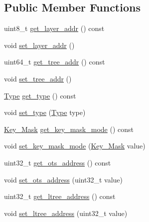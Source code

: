 \subsection*{Public Member Functions}
\begin{DoxyCompactItemize}
\item 
uint8\+\_\+t \hyperlink{class_botan_1_1_x_m_s_s___address_ac71959711edb3f719e371942247f2c74}{get\+\_\+layer\+\_\+addr} () const
\item 
void \hyperlink{class_botan_1_1_x_m_s_s___address_aca1e7f785ce8f328bd108c9cd63bde11}{set\+\_\+layer\+\_\+addr} ()
\item 
uint64\+\_\+t \hyperlink{class_botan_1_1_x_m_s_s___address_ac6ffefc09f01cd25f9acb76f6fcd4071}{get\+\_\+tree\+\_\+addr} () const
\item 
void \hyperlink{class_botan_1_1_x_m_s_s___address_af0c3a079be599e10d72e14223f8ea16d}{set\+\_\+tree\+\_\+addr} ()
\item 
\hyperlink{class_botan_1_1_x_m_s_s___address_a0101e45c5608cf312b497bf6d855000e}{Type} \hyperlink{class_botan_1_1_x_m_s_s___address_a278cf3ba854261fd2c73fbc996fb89b1}{get\+\_\+type} () const
\item 
void \hyperlink{class_botan_1_1_x_m_s_s___address_a57148e8e415efce53531406607526236}{set\+\_\+type} (\hyperlink{class_botan_1_1_x_m_s_s___address_a0101e45c5608cf312b497bf6d855000e}{Type} type)
\item 
\hyperlink{class_botan_1_1_x_m_s_s___address_a85146c0c3e049f62c413194049f501e3}{Key\+\_\+\+Mask} \hyperlink{class_botan_1_1_x_m_s_s___address_af74b11e3ced49d405e2c84ca51191d61}{get\+\_\+key\+\_\+mask\+\_\+mode} () const
\item 
void \hyperlink{class_botan_1_1_x_m_s_s___address_a12a0bcf65685053363b944be811f57db}{set\+\_\+key\+\_\+mask\+\_\+mode} (\hyperlink{class_botan_1_1_x_m_s_s___address_a85146c0c3e049f62c413194049f501e3}{Key\+\_\+\+Mask} value)
\item 
uint32\+\_\+t \hyperlink{class_botan_1_1_x_m_s_s___address_a51d64c847fb1ba38a29c24da4b590c83}{get\+\_\+ots\+\_\+address} () const
\item 
void \hyperlink{class_botan_1_1_x_m_s_s___address_a2219e289707137fda458eec819933be9}{set\+\_\+ots\+\_\+address} (uint32\+\_\+t value)
\item 
uint32\+\_\+t \hyperlink{class_botan_1_1_x_m_s_s___address_a67c3f3349ae7545bccf57f6e37f81849}{get\+\_\+ltree\+\_\+address} () const
\item 
void \hyperlink{class_botan_1_1_x_m_s_s___address_af410fcbcc750a12e8650307d51003bc2}{set\+\_\+ltree\+\_\+address} (uint32\+\_\+t value)

\end{DoxyCompactItemize}
